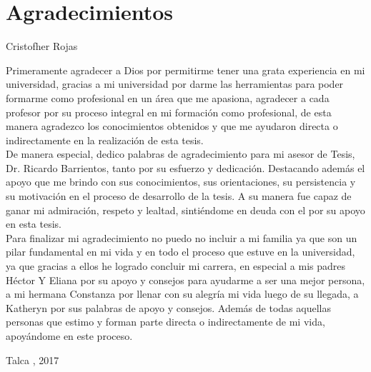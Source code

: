 \section*{Agradecimientos}
	\thispagestyle{empty}	

\begin{flushright}
	Cristofher Rojas
\end{flushright}

Primeramente agradecer a Dios por permitirme tener una grata experiencia en mi universidad, gracias a mi universidad por darme las herramientas para poder formarme como profesional en un área que me apasiona, agradecer a cada profesor por su proceso integral en mi formación como profesional, de esta manera agradezco los conocimientos obtenidos y que me ayudaron directa o indirectamente en la realización de esta tesis.
\\
De manera especial, dedico palabras de agradecimiento para mi asesor de Tesis, Dr. Ricardo Barrientos, tanto por su esfuerzo y dedicación. Destacando además el apoyo que me brindo con sus conocimientos, sus orientaciones, su persistencia y su motivación en el proceso de desarrollo de la tesis. A su manera fue capaz de ganar mi admiración, respeto y lealtad, sintiéndome en deuda con el por su apoyo en esta tesis.\\

Para finalizar mi agradecimiento no puedo no incluir a mi familia ya que son un pilar fundamental en mi vida y en todo el proceso que estuve en la universidad, ya que gracias a ellos he logrado concluir mi carrera, en especial a mis padres Héctor Y Eliana por su apoyo y consejos para ayudarme a ser una mejor persona, a mi hermana Constanza por llenar con su alegría mi vida luego de su llegada, a Katheryn por sus palabras de apoyo y consejos. Además de todas aquellas personas que estimo y forman parte directa o indirectamente de mi vida, apoyándome en este proceso.  

\begin{flushright}
 	Talca , 2017
\end{flushright}
